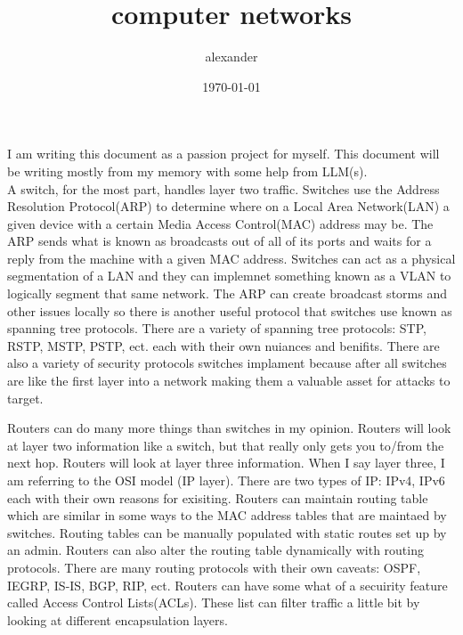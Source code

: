 \documentclass{article}
\title{computer networks}
\author{alexander}
\date{\today}
\begin{document}
\maketitle

I am writing this document as a passion project for myself. This document will be writing mostly from my memory with some help from LLM(s).\\

A switch, for the most part, handles layer two traffic. Switches use the Address Resolution Protocol(ARP) to determine where on a Local Area Network(LAN) a given device with a certain Media Access Control(MAC) address may be. The ARP sends what is known as broadcasts out of all of its ports and waits for a reply from the machine with a given MAC address. Switches can act as a physical segmentation of a LAN and they can implemnet something known as a VLAN to logically segment that same network. The ARP can create broadcast storms and other issues locally so there is another useful protocol that switches use known as spanning tree protocols. There are a variety of spanning tree protocols: STP, RSTP, MSTP, PSTP, ect. each with their own nuiances and benifits. There are also a variety of security protocols switches implament because after all switches are like the first layer into a network making them a valuable asset for attacks to target.

Routers can do many more things than switches in my opinion. Routers will look at layer two information like a switch, but that really only gets you to/from the next hop. Routers will look at layer three information. When I say layer three, I am referring to the OSI model (IP layer). There are two types of IP: IPv4, IPv6 each with their own reasons for exisiting. Routers can maintain routing table which are similar in some ways to the MAC address tables that are maintaed by switches. Routing tables can be manually populated with static routes set up by an admin. Routers can also alter the routing table dynamically with routing protocols. There are many routing protocols with their own caveats: OSPF, IEGRP, IS-IS, BGP, RIP, ect. Routers can have some what of a secuirity feature called Access Control Lists(ACLs). These list can filter traffic a little bit by looking at different encapsulation layers.
\end{document}

